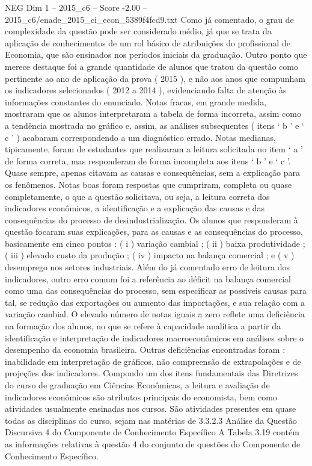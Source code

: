 \begin{textsample}{NEG Dim 1 – 2015\_c6 – Score -2.00 – 2015\_c6/enade\_2015\_ci\_econ\_5389f4fcd9.txt}
Como já comentado, o grau de complexidade da questão pode ser considerado médio, já que se trata da aplicação de conhecimentos de um rol básico de atribuições do profissional de Economia, que são ensinados nos períodos iniciais da graduação.
Outro ponto que merece destaque foi a grande quantidade de alunos que tratou da questão como pertinente ao ano de aplicação da prova ( 2015 ), e não aos anos que compunham os indicadores selecionados ( 2012 a 2014 ), evidenciando falta de atenção às informações constantes do enunciado.
Notas fracas, em grande medida, mostraram que os alunos interpretaram a tabela de forma incorreta, assim como a tendência mostrada no gráfico e, assim, as análises subsequentes ( itens ‘ b ’ e ‘ c ’ ) acabaram correspondendo a um diagnóstico errado.
Notas medianas, tipicamente, foram de estudantes que realizaram a leitura solicitada no item ‘ a ’ de forma correta, mas responderam de forma incompleta aos itens ‘ b ’ e ‘ c ’.
Quase sempre, apenas citavam as causas e consequências, sem a explicação para os fenômenos.
Notas boas foram respostas que cumpriram, completa ou quase completamente, o que a questão solicitava, ou seja, a leitura correta dos indicadores econômicos, a identificação e a explicação das causas e das consequências do processo de desindustrialização.
Os alunos que responderam à questão focaram suas explicações, para as causas e as consequências do processo, basicamente em cinco pontos : ( i ) variação cambial ; ( ii ) baixa produtividade ; ( iii ) elevado custo da produção ; ( iv ) impacto na balança comercial ; e ( v ) desemprego nos setores industriais.
Além do já comentado erro de leitura dos indicadores, outro erro comum foi a referência ao déficit na balança comercial como uma das consequências do processo, sem especificar as possíveis causas para tal, se redução das exportações ou aumento das importações, e sua relação com a variação cambial.
O elevado número de notas iguais a zero reflete uma deficiência na formação dos alunos, no que se refere à capacidade analítica a partir da identificação e interpretação de indicadores macroeconômicos em análises sobre o desempenho da economia brasileira.
Outras deficiências encontradas foram : inabilidade em interpretação de gráficos, não compreensão de extrapolações e de projeções dos indicadores.
Compondo um dos itens fundamentais das Diretrizes do curso de graduação em Ciências Econômicas, a leitura e avaliação de indicadores econômicos são atributos principais do economista, bem como atividades usualmente ensinadas nos cursos.
São atividades presentes em quase todas as disciplinas do curso, sejam nas matérias de 3.3.2.3 Análise da Questão Discursiva 4 do Componente de Conhecimento Específico A Tabela 3.19 contém as informações relativas à questão 4 do conjunto de questões do Componente de Conhecimento Específico.

\end{textsample}
